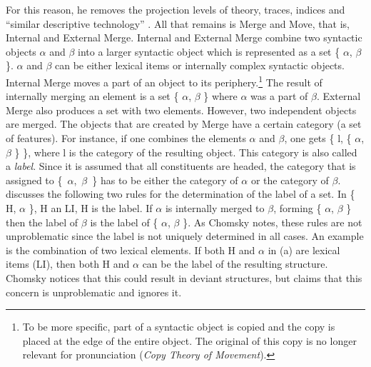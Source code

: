 For this reason, he removes the projection levels of \xbar theory, traces,
indices and ``similar descriptive technology''
\citep[]{Chomsky2008a}. All that remains is Merge and Move, that is, Internal and External Merge. Internal and External Merge combine two syntactic objects $\alpha$ and $\beta$ into a larger
syntactic object which is represented as a set \{ $\alpha$, $\beta$ \}.  $\alpha$ and $\beta$ can be
either lexical items or internally complex syntactic objects. Internal Merge moves a part of an object to its periphery.\footnote{%
To be more specific, part of a syntactic object is copied and the copy is placed at the edge of the entire object. The original of this copy is
no longer relevant for pronunciation (\emph{Copy Theory of Move\-ment}).
} The result of internally merging
an element is a set \{ $\alpha$, $\beta$ \} where $\alpha$ was a part of $\beta$. External Merge
also produces a set with two elements. However, two independent objects are merged. The objects that are created
by Merge have a certain category (a set of features). For instance, if one combines the elements $\alpha$ and $\beta$, one
gets \{ l, \{ $\alpha$, $\beta$ \} \}, where l is the category of the resulting object. This category
is also called a \emph{label}. Since it is assumed that all constituents are headed, the category that is
assigned to \{~$\alpha$,~$\beta$~\} has to be either the category of $\alpha$ or the category of
$\beta$. 
\citet[]{Chomsky2008a} discusses the following two rules for the determination of the label of a set.
\eal
\label{Label-Berechnung}
\ex\label{Label1} In \{ H, $\alpha$ \}, H an LI, H is the label.
\ex\label{Label2} If $\alpha$ is internally merged to $\beta$, forming \{ $\alpha$, $\beta$ \} then
the label of $\beta$ is the label of \{ $\alpha$, $\beta$ \}.
\zl
As Chomsky notes, these rules are not unproblematic since the label is not uniquely determined in all
cases. An example is the combination of two lexical elements. If both H and $\alpha$ in (a)
are lexical items (LI), then both H and $\alpha$ can be the label of the resulting
structure. Chomsky notices that this could result in deviant structures, but
claims that this concern is unproblematic and ignores it. 
